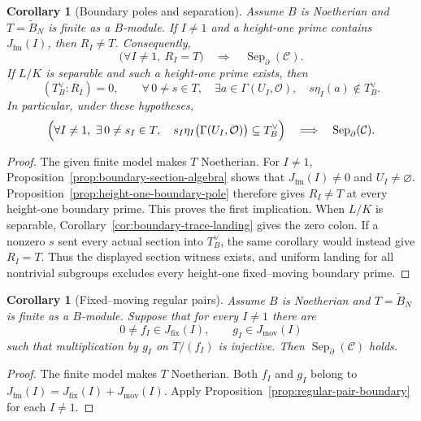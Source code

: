 \documentclass[11pt]{article}
\newtheorem{corollary}[theorem]{Corollary}
\theoremstyle{definition}
\theoremstyle{remark}
\begin{document}
\begin{corollary}[Boundary poles and separation]
\label{cor:boundary-poles-separation}
Assume \(B\) is Noetherian and \(T=\widetilde B_N\) is finite as a
\(B\)-module. If \(I\ne1\) and a height-one prime contains
\(J_{\mathrm{fm}}(I)\), then \(R_I\ne T\). Consequently,
\[
  \bigl(\forall I\ne1,\ R_I=T\bigr)
    \quad\Longrightarrow\quad\operatorname{Sep}_{\partial}(\mathcal C).
\]
If \(L/K\) is separable and such a height-one prime exists, then
\[
  (T^\vee_B:R_I)=0,\qquad
  \forall\,0\ne s\in T,\quad
  \exists a\in\Gamma(U_I,\mathcal O),\quad s\eta_I(a)\notin T^\vee_B.
\]
In particular, under these hypotheses,
\[
  \Bigl(\forall I\ne1,\ \exists\,0\ne s_I\in T,\quad
    s_I\eta_I\bigl(\Gamma(U_I,\mathcal O)\bigr)\subseteq T^\vee_B\Bigr)
  \quad\Longrightarrow\quad\operatorname{Sep}_{\partial}(\mathcal C).
\]
\end{corollary}

\begin{proof}
The given finite model makes \(T\) Noetherian.
For \(I\ne1\), Proposition~\ref{prop:boundary-section-algebra} shows
that \(J_{\mathrm{fm}}(I)\ne0\) and \(U_I\ne\varnothing\).
Proposition~\ref{prop:height-one-boundary-pole} therefore gives \(R_I\ne T\)
at every height-one boundary prime. This proves the first implication.
When \(L/K\) is separable, Corollary~\ref{cor:boundary-trace-landing} gives
the zero colon. If a nonzero \(s\) sent every actual section into
\(T^\vee_B\), the same corollary would instead give \(R_I=T\).
Thus the displayed section witness exists, and uniform landing for all
nontrivial subgroups excludes every height-one fixed--moving boundary prime.
\end{proof}

\begin{corollary}[Fixed--moving regular pairs]
\label{cor:fixed-moving-regular-pairs}
Assume \(B\) is Noetherian and \(T=\widetilde B_N\) is finite as a
\(B\)-module. Suppose that for every \(I\ne1\) there are
\[
  0\ne f_I\in J_{\mathrm{fix}}(I),\qquad
  g_I\in J_{\mathrm{mov}}(I)
\]
such that multiplication by \(g_I\) on \(T/(f_I)\) is injective.
Then \(\operatorname{Sep}_{\partial}(\mathcal C)\) holds.
\end{corollary}

\begin{proof}
The finite model makes \(T\) Noetherian. Both \(f_I\) and \(g_I\)
belong to \(J_{\mathrm{fm}}(I)=J_{\mathrm{fix}}(I)+J_{\mathrm{mov}}(I)\).
Apply Proposition~\ref{prop:regular-pair-boundary} for each \(I\ne1\).
\end{proof}
\end{document}
